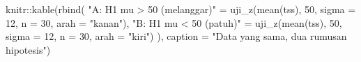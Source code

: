 \documentclass[
  indonesian,
  letterpaper,
]{book}
\newenvironment{Shaded}{\begin{snugshade}}{\end{snugshade}}
\newcommand{\AttributeTok}[1]{\textcolor[rgb]{0.40,0.45,0.13}{#1}}
\newcommand{\DecValTok}[1]{\textcolor[rgb]{0.68,0.00,0.00}{#1}}
\newcommand{\FunctionTok}[1]{\textcolor[rgb]{0.28,0.35,0.67}{#1}}
\newcommand{\NormalTok}[1]{\textcolor[rgb]{0.00,0.23,0.31}{#1}}
\newcommand{\OtherTok}[1]{\textcolor[rgb]{0.00,0.23,0.31}{#1}}
\newcommand{\SpecialCharTok}[1]{\textcolor[rgb]{0.37,0.37,0.37}{#1}}
\newcommand{\StringTok}[1]{\textcolor[rgb]{0.13,0.47,0.30}{#1}}
\begin{document}
\begin{Shaded}
\begin{Highlighting}[]
\NormalTok{knitr}\SpecialCharTok{::}\FunctionTok{kable}\NormalTok{(}\FunctionTok{rbind}\NormalTok{(}
  \StringTok{"A: H1 mu \textgreater{} 50 (melanggar)"} \OtherTok{=} \FunctionTok{uji\_z}\NormalTok{(}\FunctionTok{mean}\NormalTok{(tss), }\DecValTok{50}\NormalTok{, }\AttributeTok{sigma =} \DecValTok{12}\NormalTok{, }\AttributeTok{n =} \DecValTok{30}\NormalTok{, }\AttributeTok{arah =} \StringTok{"kanan"}\NormalTok{),}
  \StringTok{"B: H1 mu \textless{} 50 (patuh)"} \OtherTok{=} \FunctionTok{uji\_z}\NormalTok{(}\FunctionTok{mean}\NormalTok{(tss), }\DecValTok{50}\NormalTok{, }\AttributeTok{sigma =} \DecValTok{12}\NormalTok{, }\AttributeTok{n =} \DecValTok{30}\NormalTok{, }\AttributeTok{arah =} \StringTok{"kiri"}\NormalTok{)}
\NormalTok{), }\AttributeTok{caption =} \StringTok{"Data yang sama, dua rumusan hipotesis"}\NormalTok{)}
\end{Highlighting}
\end{Shaded}
\end{document}

